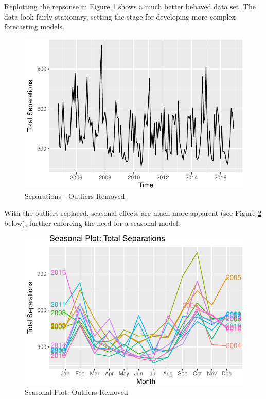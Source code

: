 \documentclass[12pt,letterpaper,toc=flat,oneside]{report}
\theoremstyle{definition}
\theoremstyle{definition}
\theoremstyle{definition}
\theoremstyle{remark}
\begin{document}
Replotting the repsonse in Figure \ref{fig:response-plot-2} shows a much
better behaved data set. The data look fairly stationary, setting the
stage for developing more complex forecasting models.

\begin{figure}[H]

{\centering \includegraphics{elliott-econometric-personnel-retention-18_files/figure-latex/response-plot-2-1} 

}

\caption{Separations - Outliers Removed}\label{fig:response-plot-2}
\end{figure}

With the outliers replaced, seasonal effects are much more apparent (see
Figure \ref{fig:response-season-plot-2} below), further enforcing the
need for a seasonal model.

\begin{figure}[H]

{\centering \includegraphics{elliott-econometric-personnel-retention-18_files/figure-latex/response-season-plot-2-1} 

}

\caption{Seasonal Plot: Outliers Removed}\label{fig:response-season-plot-2}
\end{figure}
\end{document}
